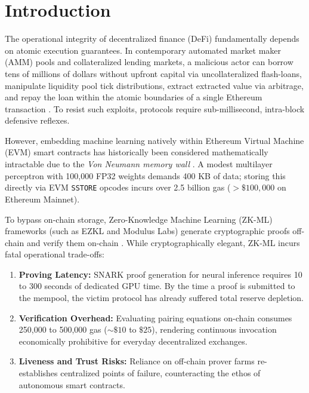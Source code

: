 \documentclass[10pt,twocolumn]{article}
\begin{document}

\section{Introduction}
The operational integrity of decentralized finance (DeFi) fundamentally depends on atomic execution guarantees. In contemporary automated market maker (AMM) pools and collateralized lending markets, a malicious actor can borrow tens of millions of dollars without upfront capital via uncollateralized flash-loans, manipulate liquidity pool tick distributions, extract extracted value via arbitrage, and repay the loan within the atomic boundaries of a single Ethereum transaction \cite{perez2021smart, qin2021attacking}. To resist such exploits, protocols require sub-millisecond, intra-block defensive reflexes.

However, embedding machine learning natively within Ethereum Virtual Machine (EVM) smart contracts has historically been considered mathematically intractable due to the \textit{Von Neumann memory wall} \cite{wood2014ethereum}. A modest multilayer perceptron with 100,000 FP32 weights demands 400 KB of data; storing this directly via EVM \texttt{SSTORE} opcodes incurs over 2.5 billion gas ($> \$100,000$ on Ethereum Mainnet).

To bypass on-chain storage, Zero-Knowledge Machine Learning (ZK-ML) frameworks (such as EZKL and Modulus Labs) generate cryptographic proofs off-chain and verify them on-chain \cite{kang2022scaling, modulus2023cost}. While cryptographically elegant, ZK-ML incurs fatal operational trade-offs:
\begin{enumerate}
    \item \textbf{Proving Latency:} SNARK proof generation for neural inference requires 10 to 300 seconds of dedicated GPU time. By the time a proof is submitted to the mempool, the victim protocol has already suffered total reserve depletion.
    \item \textbf{Verification Overhead:} Evaluating pairing equations on-chain consumes 250,000 to 500,000 gas ($\sim \$10$ to $\$25$), rendering continuous invocation economically prohibitive for everyday decentralized exchanges.
    \item \textbf{Liveness and Trust Risks:} Reliance on off-chain prover farms re-establishes centralized points of failure, counteracting the ethos of autonomous smart contracts.
\end{enumerate}
\end{document}
